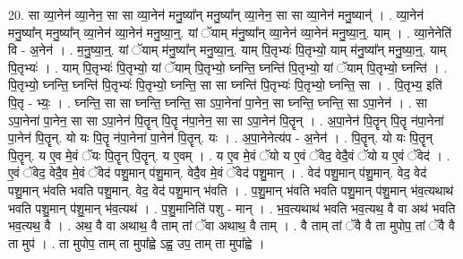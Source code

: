 \documentclass[17pt]{extarticle}
\begin{document}
20. सा व्या॒नेन॑ व्या॒नेन॒ सा सा व्या॒नेन॑ मनु॒ष्या᳚न् मनु॒ष्या᳚न् व्या॒नेन॒ सा सा व्या॒नेन॑ मनु॒ष्यान्॑ । . व्या॒नेन॑ मनु॒ष्या᳚न् मनु॒ष्या᳚न् व्या॒नेन॑ व्या॒नेन॑ मनु॒ष्या॒न्॒. यां ॅयाम् म॑नु॒ष्या᳚न् व्या॒नेन॑ व्या॒नेन॑ मनु॒ष्या॒न्॒. याम् । . व्या॒नेनेति॑ वि - अ॒नेन॑ । . म॒नु॒ष्या॒न्॒. यां ॅयाम् म॑नु॒ष्या᳚न् मनु॒ष्या॒न्॒. याम् पि॒तृभ्यः॑ पि॒तृभ्यो॒ याम् म॑नु॒ष्या᳚न् मनु॒ष्या॒न्॒. याम् पि॒तृभ्यः॑ । . याम् पि॒तृभ्यः॑ पि॒तृभ्यो॒ यां ॅयाम् पि॒तृभ्यो॒ घ्नन्ति॒ घ्नन्ति॑ पि॒तृभ्यो॒ यां ॅयाम् पि॒तृभ्यो॒ घ्नन्ति॑ । . पि॒तृभ्यो॒ घ्नन्ति॒ घ्नन्ति॑ पि॒तृभ्यः॑ पि॒तृभ्यो॒ घ्नन्ति॒ सा सा घ्नन्ति॑ पि॒तृभ्यः॑ पि॒तृभ्यो॒ घ्नन्ति॒ सा । . पि॒तृभ्य॒ इति॑ पि॒तृ - भ्यः॒ । . घ्नन्ति॒ सा सा घ्नन्ति॒ घ्नन्ति॒ सा ऽपा॒नेना॑ पा॒नेन॒ सा घ्नन्ति॒ घ्नन्ति॒ सा ऽपा॒नेन॑ । . सा ऽपा॒नेना॑ पा॒नेन॒ सा सा ऽपा॒नेन॑ पि॒तॄन् पि॒तॄ न॑पा॒नेन॒ सा सा ऽपा॒नेन॑ पि॒तॄन् । . अ॒पा॒नेन॑ पि॒तॄन् पि॒तॄ न॑पा॒नेना॑ पा॒नेन॑ पि॒तॄन्. यो यः पि॒तॄ न॑पा॒नेना॑ पा॒नेन॑ पि॒तॄन्. यः । . अ॒पा॒नेनेत्य॑प - अ॒नेन॑ । . पि॒तॄन्. यो यः पि॒तॄन् पि॒तॄन्. य ए॒व मे॒वं ॅयः पि॒तॄन् पि॒तॄन्. य ए॒वम् । . य ए॒व मे॒वं ॅयो य ए॒वं ॅवेद॒ वेदै॒वं ॅयो य ए॒वं ॅवेद॑ । . ए॒वं ॅवेद॒ वेदै॒व मे॒वं ॅवेद॑ पशु॒मान् प॑शु॒मान्. वेदै॒व मे॒वं ॅवेद॑ पशु॒मान् । . वेद॑ पशु॒मान् प॑शु॒मान्. वेद॒ वेद॑ पशु॒मान् भ॑वति भवति पशु॒मान्. वेद॒ वेद॑ पशु॒मान् भ॑वति । . प॒शु॒मान् भ॑वति भवति पशु॒मान् प॑शु॒मान् भ॑व॒त्यथाथ॑ भवति पशु॒मान् प॑शु॒मान् भ॑व॒त्यथ॑ । . प॒शु॒मानिति॑ पशु - मान् । . भ॒व॒त्यथाथ॑ भवति भव॒त्यथ॒ वै वा अथ॑ भवति भव॒त्यथ॒ वै । . अथ॒ वै वा अथाथ॒ वै ताम् तां ॅवा अथाथ॒ वै ताम् । . वै ताम् तां ॅवै वै ता मुपोप॒ तां ॅवै वै ता मुप॑ । . ता मुपोप॒ ताम् ता मुपा᳚ह्वे ऽह्व॒ उप॒ ताम् ता मुपा᳚ह्वे । \newline
\end{document}
